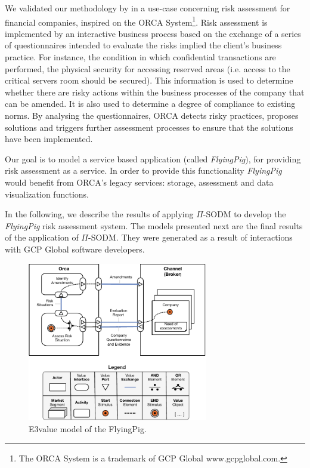 We validated our methodology by in a use-case concerning risk assessment for financial companies, inspired on the ORCA System\footnote{The ORCA System is a trademark of GCP Global www.gcpglobal.com.}.
Risk assessment is implemented by an interactive business process based on the exchange of a series of questionnaires intended to evaluate the risks implied the client's business practice.
For instance, the condition in which confidential transactions are performed, the physical security for accessing reserved areas (i.e. access to the critical servers room should be secured).
This information is used to determine whether there are risky actions within the business processes of the company that can be amended.
It is also used to determine a degree of compliance to existing norms.
By analysing the questionnaires, ORCA detects risky practices, proposes solutions and triggers further assessment processes to ensure that the solutions have been implemented.

Our goal is to model a service based application (called \textsl{FlyingPig}), for providing risk assessment as a service.
In order to provide this functionality \textsl{FlyingPig} would benefit from ORCA's legacy services: storage, assessment and data visualization functions.

In the following, we describe the results of applying $\Pi$-SODM to develop the \textsl{FlyingPig} risk assessment system.
The models presented next are the final results of the application of $\Pi$-SODM.
They were generated as a result of interactions with GCP Global software developers.

\begin{figure}
\centering
\includegraphics[width=0.7\textwidth]{figs/E3-Value.pdf}
\caption{E3value model of the FlyingPig.\label{fig:E3valuemodel}}
\end{figure}


